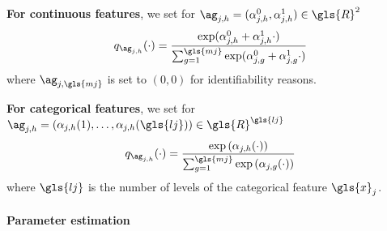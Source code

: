  {\bf For continuous features}, we set for $\ag_{j,h} = (\alpha^0_{j,h},\alpha^1_{j,h}) \in \gls{R}^2$
\begin{equation} \label{eq:softmax}
q_{\ag_{j,h}}(\cdot) = \frac{\exp(\alpha^0_{j,h} + \alpha^1_{j,h}  \cdot)}{\sum_{g=1}^{\gls{mj}} \exp(\alpha^0_{j,g} + \alpha^1_{j,g}  \cdot)}
\end{equation}
where $\ag_{j,\gls{mj}}$ is set to $(0,0)$ for identifiability reasons.




{\bf For categorical features}, we set for $\ag_{j,h}=\left(\alpha_{j,h}(1),\ldots, \alpha_{j,h}(\gls{lj})\right) \in \gls{R}^{\gls{lj}}$
\[q_{\ag_{j,h}}(\cdot) = \frac{\exp\left(\alpha_{j,h}(\cdot)\right)}{\sum_{g=1}^{\gls{mj}} \exp\left(\alpha_{j,g}(\cdot)\right)}\]
where $\gls{lj}$ is the number of levels of the categorical feature $\gls{x}_j$.



\paragraph{Parameter estimation}

